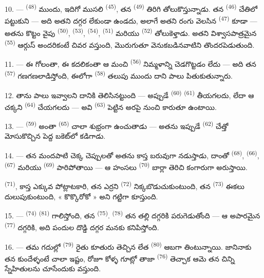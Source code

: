 10. ---  \textsuperscript{(48)} ముందు, ఇదిగో ముసలి
 \textsuperscript{(45)}, తన  \textsuperscript{(49)} తిరిగి
తోలుకొస్తున్నాడు. తన  \textsuperscript{(46)} చేతిలో పట్టుకుని — అది అతని దగ్గర
లేకుండా ఉండదు, అలాగే అతని రంగు వెలసిన  \textsuperscript{(47)} కూడా — అతను కొట్టం
వైపు  \textsuperscript{(50)},  \textsuperscript{(53)},
 \textsuperscript{(54)},  \textsuperscript{(51)} మరియు
 \textsuperscript{(52)} తోలుకెళ్తాడు. అతని విశ్వాసపాత్రమైన 
\textsuperscript{(55)} ఆర్గుస్ అందరికంటే చివర వస్తుంది, మొరుగుతూ వెనుకబడినవాటిని
తొందరపెడుతుంది.

11. --- ఈ గోలంతా, ఈ కదలికంతా ఆ మంచి  \textsuperscript{(56)} నిమ్మళాన్ని
చెడగొట్టడం లేదు — అది తన  \textsuperscript{(57)} గణగణలాడిస్తోంది, ఈలోగా
 \textsuperscript{(58)} తలుపు ముందు దాని పాలు పితుకుతున్నారు.

12. తాను పాలు ఇవ్వాలని దానికి తెలిసినట్టుంది — అప్పుడే  \textsuperscript{(60)}
 \textsuperscript{(61)}  తీయగలదు, లేదా ఆ చక్కని 
\textsuperscript{(64)} చేయగలదు — అవి  \textsuperscript{(63)} పెట్టిన
అరపై నుంచి కారుతూ ఉంటాయి.

13. ---  \textsuperscript{(59)} అంతా  \textsuperscript{(65)}
చాలా శుభ్రంగా ఉంచుతాడు — అతను ఇప్పుడే  \textsuperscript{(62)} చేత్తో
మోసుకొచ్చిన పెద్ద బకెట్‌లో కడిగాడు.

\VUsaut{3.0mm}
\VUsaut{3.0mm}

14. --- తన మందపాటి చెక్క చెప్పులతో అతను కాస్త బరువుగా నడుస్తాడు, దాంతో 
\textsuperscript{(68)},  \textsuperscript{(66)}, 
\textsuperscript{(67)} మరియు  \textsuperscript{(69)} పారిపోతాయి — ఆ హంసలు
 \textsuperscript{(70)} బార్లా తెరిచి కంగారుగా అరుస్తాయి.

 \textsuperscript{(71)}, కాస్త ఎక్కువ పోట్లాటకారి, తన ఎర్రని 
\textsuperscript{(72)} నిక్కబొడుచుకుంటుంది, తన  \textsuperscript{(73)} ఈకలు
దులుపుకుంటుంది, « కొక్కొరోకో » అని గట్టిగా కూస్తుంది.

15. ---  \textsuperscript{(74)}  \textsuperscript{(81)}
గాలిస్తోంది, తన  \textsuperscript{(75)}. 
\textsuperscript{(78)} తన తల్లి దగ్గరికి పరుగెడుతోంది — ఆ అపారమైన 
\textsuperscript{(77)} దగ్గరికి, అది పందుల దొడ్డి దగ్గర మనకు కనిపిస్తోంది.

16. --- తమ గదుల్లో  \textsuperscript{(79)} రైతు కూతురు తెచ్చిన లేత
 \textsuperscript{(80)} ఆబగా తింటున్నాయి. జానినాకు తన కుందేళ్ళంటే చాలా ఇష్టం,
రోజూ కోళ్ళ గూట్లో తాజా  \textsuperscript{(76)} తెచ్చాక ఆమె తన చిన్ని
స్నేహితులను చూసేందుకు వస్తుంది.

\VUsaut{6.0mm}
\VUfilet{22mm}
